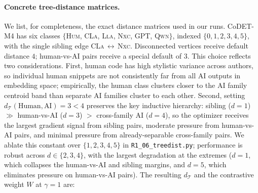 ﻿\documentclass[11pt]{article}
\begin{document}
\paragraph{Concrete tree-distance matrices.} We
list, for completeness, the exact distance matrices used in our
runs. CoDET-M4 has six classes
$\{$\textsc{Hum}, \textsc{CLa}, \textsc{Lla}, \textsc{Nxc},
\textsc{GPT}, \textsc{Qwn}$\}$, indexed $\{0,1,2,3,4,5\}$, with the
single sibling edge \textsc{CLa}\,$\leftrightarrow$\,\textsc{Nxc}.
Disconnected vertices receive default distance $4$; human-vs-AI
pairs receive a special default of $3$. This choice reflects two
considerations. First, human code has high stylistic variance
across authors, so individual human snippets are not consistently
far from all AI outputs in embedding space; empirically, the
human class clusters closer to the AI family centroid band than
separate AI families cluster to each other. Second, setting
$d_{\mathcal{T}}(\text{Human},\text{AI}){=}3 < 4$ preserves the
key inductive hierarchy: sibling ($d{=}1$) $\gg$
human-vs-AI ($d{=}3$) $>$ cross-family AI ($d{=}4$), so the
optimizer receives the largest gradient signal from sibling pairs,
moderate pressure from human-vs-AI pairs, and minimal pressure
from already-separable cross-family pairs. We ablate this constant
over $\{1,2,3,4,5\}$ in \texttt{R1\_06\_treedist.py};
performance is robust across $d \in \{2,3,4\}$, with the
largest degradation at the extremes ($d{=}1$, which collapses
the human-vs-AI and sibling margins, and $d{=}5$, which eliminates
pressure on human-vs-AI pairs).
The resulting $d_{\mathcal{T}}$ and the contrastive weight $W$ at
$\gamma{=}1$ are:
\end{document}
